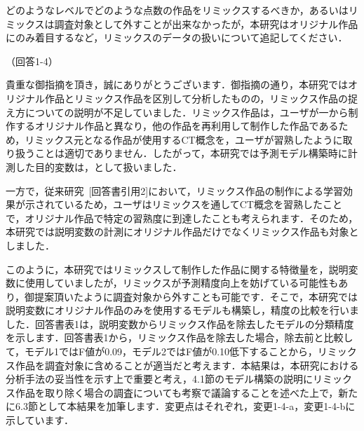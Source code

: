 \documentclass{jarticle} %
\def\subsection#1{ \vspace{1pc} {\gt #1} }
\begin{document}
どのようなレベルでどのような点数の作品をリミックスするべきか，あるいはリミックスは調査対象として外すことが出来なかったが，本研究はオリジナル作品にのみ着目するなど，リミックスのデータの扱いについて追記してください．

\subsection{（回答1-4）}

貴重な御指摘を頂き，誠にありがとうございます．御指摘の通り，本研究ではオリジナル作品とリミックス作品を区別して分析したものの，リミックス作品の捉え方についての説明が不足していました．リミックス作品は，ユーザが一から制作するオリジナル作品と異なり，他の作品を再利用して制作した作品であるため，リミックス元となる作品が使用するCT概念を，ユーザが習熟したように取り扱うことは適切でありません．したがって，本研究では予測モデル構築時に計測した目的変数は，として扱いました．

一方で，従来研究~[回答書引用2]において，リミックス作品の制作による学習効果が示されているため，ユーザはリミックスを通してCT概念を習熟したことで，オリジナル作品で特定の習熟度に到達したことも考えられます．そのため，本研究では説明変数の計測にオリジナル作品だけでなくリミックス作品も対象としました．

このように，本研究ではリミックスして制作した作品に関する特徴量を，説明変数に使用していましたが，リミックスが予測精度向上を妨げている可能性もあり，御提案頂いたように調査対象から外すことも可能です．そこで，本研究では説明変数にオリジナル作品のみを使用するモデルも構築し，精度の比較を行いました．回答書表1は，説明変数からリミックス作品を除去したモデルの分類精度を示します．回答書表1から，リミックス作品を除去した場合，除去前と比較して，モデル1ではF値が0.09，モデル2ではF値が0.10低下することから，リミックス作品を調査対象に含めることが適当だと考えます．本結果は，本研究における分析手法の妥当性を示す上で重要と考え，4.1節のモデル構築の説明にリミックス作品を取り除く場合の調査についても考察で議論することを述べた上で，新たに6.3節として本結果を加筆します．変更点はそれぞれ，変更1-4-a，変更1-4-bに示しています．
\end{document}
